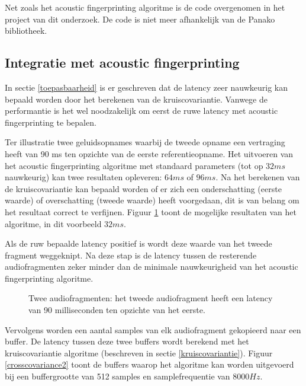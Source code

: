 Net zoals het acoustic fingerprinting algoritme is de code overgenomen in het project van dit onderzoek. De code is niet meer afhankelijk van de Panako bibliotheek.

\subsection{Integratie met acoustic fingerprinting}
\label{integratie-acoustic-fingerprinting}

In sectie \ref{toepasbaarheid} is er geschreven dat de latency zeer nauwkeurig kan bepaald worden door het berekenen van de kruiscovariantie. Vanwege de performantie is het wel noodzakelijk om eerst de ruwe latency met acoustic fingerprinting te bepalen. 

Ter illustratie twee geluidsopnames waarbij de tweede opname een vertraging heeft van 90 ms ten opzichte van de eerste referentieopname. Het uitvoeren van het acoustic fingerprinting algoritme met standaard parameters (tot op $ 32 ms $ nauwkeurig) kan twee resultaten opleveren: $ 64 ms $ of $ 96 ms $. Na het berekenen van de kruiscovariantie kan bepaald worden of er zich een onderschatting (eerste waarde) of overschatting (tweede waarde) heeft voorgedaan, dit is van belang om het resultaat correct te verfijnen. Figuur \ref{crosscovariance1} toont de mogelijke resultaten van het algoritme, in dit voorbeeld $32ms$.

Als de ruw bepaalde latency positief is wordt deze waarde van het tweede fragment weggeknipt. Na deze stap is de latency tussen de resterende audiofragmenten zeker minder dan de minimale nauwkeurigheid van het acoustic fingerprinting algoritme. 

\begin{figure}[h!]
	\captionsetup{width=0.7\textwidth}
	\caption[Kruiscovariantie audiofragmenten]{Twee audiofragmenten: het tweede audiofragment heeft een latency van 90 milliseconden ten opzichte van het eerste.}
	\begin{center}
		\advance\parskip0.3cm
		
	\end{center}
	\label{crosscovariance1}
\end{figure}


Vervolgens worden een aantal samples van elk audiofragment gekopieerd naar een buffer. De latency tussen deze twee buffers wordt berekend met het kruiscovariantie algoritme (beschreven in sectie \ref{kruiscovariantie}). Figuur \ref{crosscovariance2} toont de buffers waarop het algoritme kan worden uitgevoerd bij een buffergrootte van 512 samples en samplefrequentie van $ 8000Hz $.

